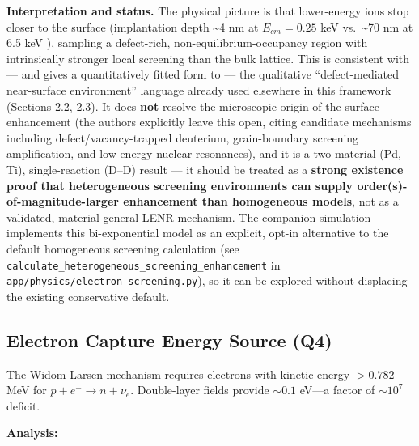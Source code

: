 \documentclass[11pt,a4paper]{article}
\begin{document}
\textbf{Interpretation and status.} The physical picture is that lower-energy ions stop closer to the surface (implantation depth \textasciitilde4 nm at $E_{cm}=0.25$ keV vs.~\textasciitilde70 nm at 6.5 keV \citep{menlove1989}), sampling a defect-rich, non-equilibrium-occupancy region with intrinsically stronger local screening than the bulk lattice. This is consistent with --- and gives a quantitatively fitted form to --- the qualitative ``defect-mediated near-surface environment'' language already used elsewhere in this framework (Sections 2.2, 2.3). It does \textbf{not} resolve the microscopic origin of the surface enhancement (the authors explicitly leave this open, citing candidate mechanisms including defect/vacancy-trapped deuterium, grain-boundary screening amplification, and low-energy nuclear resonances), and it is a two-material (Pd, Ti), single-reaction (D--D) result --- it should be treated as a \textbf{strong existence proof that heterogeneous screening environments can supply order(s)-of-magnitude-larger enhancement than homogeneous models}, not as a validated, material-general LENR mechanism. The companion simulation implements this bi-exponential model as an explicit, opt-in alternative to the default homogeneous screening calculation (see \texttt{calculate\_heterogeneous\_screening\_enhancement} in \texttt{app/physics/electron\_screening.py}), so it can be explored without displacing the existing conservative default.

\subsection{Electron Capture Energy Source (Q4)}

The Widom-Larsen mechanism requires electrons with kinetic energy $> 0.782$ MeV for $p + e^- \to n + \nu_e$. Double-layer fields provide $\sim 0.1$ eV---a factor of $\sim 10^7$ deficit.

\textbf{Analysis:}
\end{document}
